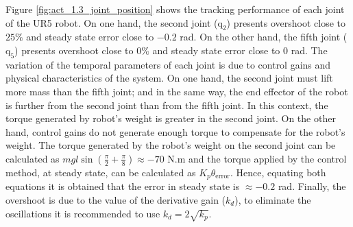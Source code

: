 Figure \ref{fig:act_1.3_joint_position} shows the tracking performance of each joint of the UR5 robot. On one hand, the second joint ($\mathrm{q}_2$) presents overshoot close to $25\%$ and steady state error close to $-0.2$ rad. On the other hand, the fifth joint ($\mathrm{q}_5$) presents overshoot close to $0\%$ and steady state error close to $0$ rad. The variation of the temporal parameters of each joint is due to control gains and physical characteristics of the system. On one hand, the second joint must lift more mass than the fifth joint; and in the same way, the end effector of the robot is further from the second joint than from the fifth joint. In this context, the torque generated by robot's weight is greater in the second joint. On the other hand, control gains do not generate enough torque to compensate for the robot's weight. The torque generated by the robot's weight on the second joint can be calculated as $m g l \sin({\frac{\pi}{2} + \frac{\pi}{8}}) \approx -70$ N.m and the torque applied by the control method, at steady state, can be calculated as $K_p \theta_{\mathrm{error}}$. Hence, equating both equations it is obtained that the error in steady state is $\approx -0.2$ rad. Finally, the overshoot is due to the value of the derivative gain ($k_d$), to eliminate the oscillations it is recommended to use $k_d = 2 \sqrt{k_p}$. \vspace{5px}

